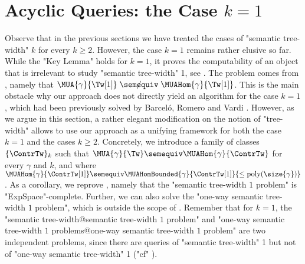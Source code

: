\section{\AP{}Acyclic Queries: the Case $k=1$}
\label{sec:acyclic-queries}



Observe that in the previous sections we have treated the cases of "semantic tree-width" $k$ for every $k\geq 2$. However, the case $k=1$ remains rather elusive so far. 
While the "Key Lemma" holds for $k=1$, it proves the computability of an object that
is irrelevant to study "semantic tree-width" 1, see . 
The problem comes from , namely that
$\MUA{\gamma}{\Tw[1]} \centernot{\semequiv} \MUAHom{\gamma}{\Tw[1]}$.
This is the main obstacle why our approach does not directly yield an algorithm for the case $k=1$, which had been previously solved by Barceló, Romero and Vardi \cite{BarceloRV16}. 
However, as we argue in this section, a rather elegant modification on the notion of "tree-width" allows to use our approach as a unifying framework for both the case $k=1$ and the cases
$k \geq 2$. 
Concretely, we introduce a family of classes $\set{\ContrTw}_k$ such that 
$\MUA{\gamma}{\Tw} \semequiv \MUAHom{\gamma}{\ContrTw}$ for every $\gamma$ and $k$, and where 
$\MUAHom{\gamma}{\ContrTw[1]} \semequiv \MUAHomBounded{\gamma}{\ContrTw[1]}{\leq\poly(\size{\gamma})}$.
As a corollary, we reprove \cite[Theorem~6.1]{BarceloRV16}, namely that the "semantic tree-width $1$ problem" is "ExpSpace"-complete. Further, we can also solve the "one-way semantic tree-width $1$ problem", which is outside the scope of \cite{BarceloRV16}. 
Remember that for $k=1$, the "semantic tree-width@semantic tree-width $1$ problem" and "one-way semantic tree-width $1$ problems@one-way semantic tree-width $1$ problem" are two independent problems, since there are queries of "semantic tree-width" 1 but not of "one-way semantic tree-width" 1 ("cf" ).



